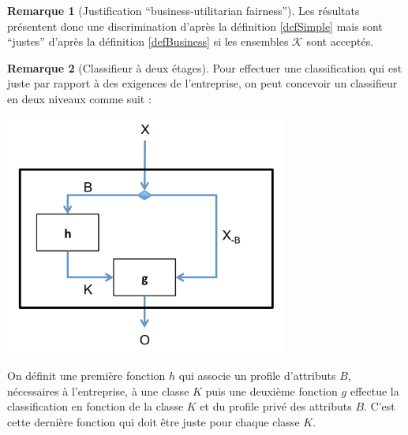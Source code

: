 \documentclass{article}
\theoremstyle{definition}
\newtheorem{myRem}{Remarque}
\begin{document}
\begin{myRem}[Justification ``business-utilitarian fairness'']
  Les résultats présentent donc une discrimination d'après la définition \ref{defSimple} mais sont ``justes'' d'après la définition \ref{defBusiness} si les ensembles $\mathcal{K}$ sont acceptés.
\end{myRem}

\begin{myRem}[Classifieur à deux étages]
  Pour effectuer une classification qui est juste par rapport à des exigences de l'entreprise, on peut concevoir un classifieur en deux niveaux comme suit :
  \begin{center}
    \includegraphics[width=0.7\textwidth]{twoStageClassifier}
  \end{center}
  On définit une première fonction $h$ qui associe un profile d'attributs $B$, nécessaires à l'entreprise, à une classe $K$ puis une deuxième fonction $g$ effectue la classification en fonction de la classe $K$ et du profile privé des attributs $B$. C'est cette dernière fonction qui doit être juste pour chaque classe $K$.
\end{myRem}
\end{document}
